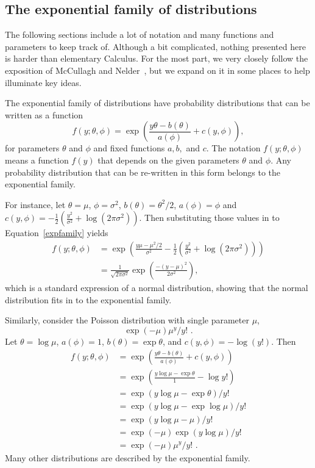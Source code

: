 \documentclass[10pt]{article} %
\begin{document}
\subsection*{The exponential family of distributions}

The following sections include a lot of notation and many functions and
parameters to keep track of. Although a bit complicated, nothing presented here
is harder than elementary Calculus. For the most part, we very closely follow
the exposition of McCullagh and Nelder~\cite{MN}, but we expand on it in some
places to help illuminate key ideas.

The exponential family of distributions have probability distributions
that can be written as a function
\begin{equation}\label{expfamily}
f(y; \theta, \phi) = \exp\left(\frac{y\theta - b(\theta)}{a(\phi)} + c(y, \phi)\right),
\end{equation}
for parameters $\theta$ and $\phi$ and fixed functions $a,b,$ and $c$.
The notation $f(y; \theta, \phi)$ means a function $f(y)$ that
depends on the given parameters $\theta$ and $\phi$.
Any probability distribution that can be re-written in this form belongs
to the exponential family.

For instance, let
$\theta=\mu$, $\phi=\sigma^2$, $b(\theta)=\theta^2/2$, $a(\phi)=\phi$
and $c(y, \phi) = -\frac{1}{2}(\frac{y^2}{\sigma^2} + \log(2\pi\sigma^2))$.
Then substituting those values in to Equation~\ref{expfamily} yields
\begin{align*}
f(y; \theta, \phi) &=
  \exp\left(\frac{y\mu - \mu^2/2}{\sigma^2} - \frac{1}{2}\left(\frac{y^2}{\sigma^2} + \log(2\pi\sigma^2)\right)\right)\\
&= \frac{1}{\sqrt{2\pi\sigma^2}}\exp\left(\frac{-(y - \mu)^2}{2\sigma^2}\right),
\end{align*}
which is a standard expression of a normal distribution,
showing that the normal distribution fits in to the exponential
family.

Similarly, consider the Poisson distribution with single parameter
$\mu$,
\[
\exp(-\mu)\mu^y/{y!}\,\,.
\]
Let $\theta=\log\mu$, $a(\phi)=1$, $b(\theta)=\exp\theta$, and
$c(y, \phi)=-\log{(y!)}$. Then
\begin{align*}
f(y; \theta, \phi) &=  \exp\left(\frac{y\theta - b(\theta)}{a(\phi)} + c(y, \phi)\right)\\
&= \exp\left(\frac{y\log\mu - \exp\theta}{1} - \log y!\right)\\
&= {\exp(y\log\mu - \exp\theta)}/{y!}\\
&= {\exp(y\log\mu - \exp\log\mu)}/{y!}\\
&= \exp(y\log\mu - \mu)/y!\\
&= \exp{(-\mu)}\exp{(y\log\mu)}/y!\\
&= \exp(-\mu)\mu^y/y!\,\,.
\end{align*}
Many other distributions are described by the exponential family.
\end{document}
